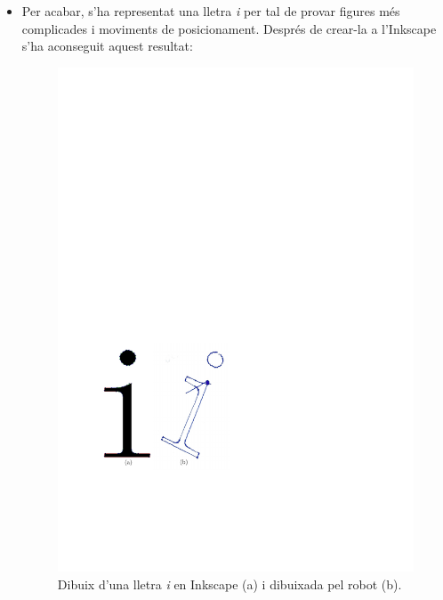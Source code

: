 \begin{itemize}
	\item Per acabar, s'ha representat una lletra \textit{i} per tal de provar figures més complicades i moviments de posicionament. Després de crear-la a l'Inkscape s'ha aconseguit aquest resultat:
	\begin{figure}[H]
		\centering
		\includegraphics{resultatLletra}
		\caption{Dibuix d'una lletra \textit{i} en Inkscape (a) i dibuixada pel robot (b).}
		\label{fig:Lletra}
	\end{figure}

\end{itemize}
